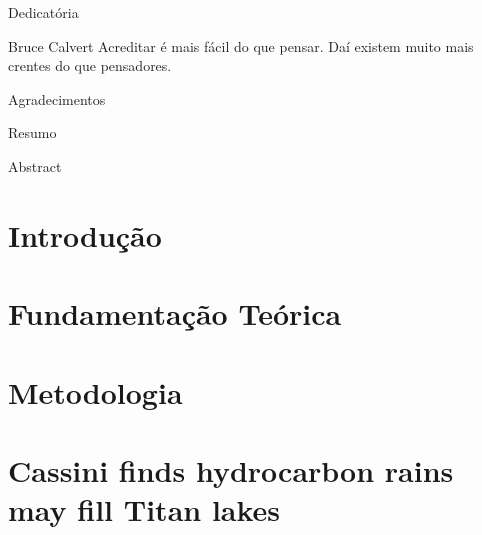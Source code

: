 \documentclass[capchap,capsec,sumarioincompleto,a4paper,12pt,ruledheader,normaltoc]{utfprtex}%
\begin{document}

\capa %
\folhaderosto
\termodeaprovacao


\begin{Dedicatoria}
\begin{flushright}
Dedicatória
\end{flushright}
\end{Dedicatoria}

\begin{Epigrafe}{Bruce Calvert} %
Acreditar é mais fácil do que pensar. Daí existem muito mais crentes do que pensadores.
\end{Epigrafe}


\begin{Agradecimentos}
Agradecimentos
\end{Agradecimentos}

\begin{Resumo}
Resumo

\end{Resumo}

\begin{Abstract}
Abstract
\end{Abstract}

\listadefiguras
\listofquadro
\listadetabelas
\listadesiglas
\listadesimbolos

\sumario

\chapter{Introdução}
%

\chapter{Fundamentação Teórica}
%

\chapter{Metodologia}
%


\chapter{Cassini finds hydrocarbon rains may fill Titan lakes}

\end{document}

